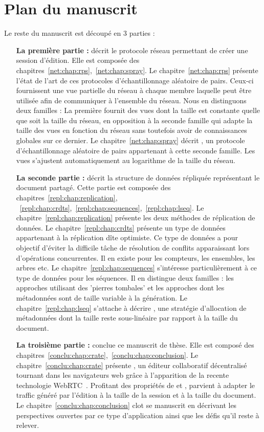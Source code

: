 
\section{Plan du manuscrit}

Le reste du manuscrit est découpé en 3 parties :

\begin{itemize}
\item [\textbf{La première partie :}] décrit le protocole réseau permettant de
  créer une session d'édition. Elle est composée des
  chapitres~\ref{net:chap:rps},~\ref{net:chap:spray}. Le
  chapitre~\ref{net:chap:rps} présente l'état de l'art de ces protocoles
  d'échantillonnage aléatoire de pairs. Ceux-ci fournissent une vue partielle du
  réseau à chaque membre laquelle peut être utilisée afin de communiquer à
  l'ensemble du réseau. Nous en distinguons deux familles : La première fournit
  des vues dont la taille est constante quelle que soit la taille du réseau, en
  opposition à la seconde famille qui adapte la taille des vues en fonction du
  réseau sans toutefois avoir de connaissances globales sur ce dernier. Le
  chapitre~\ref{net:chap:spray} décrit \SPRAY, un protocole d'échantillonnage
  aléatoire de pairs appartenant à cette seconde famille. Les vues s'ajustent
  automatiquement au logarithme de la taille du réseau.
\item [\textbf{La seconde partie :}] décrit la structure de données répliquée
  représentant le document partagé. Cette partie est composée des
  chapitres~\ref{repl:chap:replication},
  ~\ref{repl:chap:crdts},~\ref{repl:chap:sequences},~\ref{repl:chap:lseq}. Le
  chapitre~\ref{repl:chap:replication} présente les deux méthodes de réplication
  de données. Le chapitre~\ref{repl:chap:crdts} présente un type de données
  appartenant à la réplication dîte optimiste. Ce type de données a pour
  objectif d'éviter la difficile tâche de résolution de conflits apparaissant
  lors d'opérations concurrentes. Il en existe pour les compteurs, les
  ensembles, les arbres etc. Le chapitre~\ref{repl:chap:sequences} s'intéresse
  particulièrement à ce type de données pour les séquences. Il en distingue deux
  familles : les approches utilisant des 'pierres tombales' et les approches
  dont les métadonnées sont de taille variable à la génération. Le
  chapitre~\ref{repl:chap:lseq} s'attache à décrire \LSEQ, une stratégie
  d'allocation de métadonnées dont la taille reste sous-linéaire par rapport à
  la taille du document.
\item [\textbf{La troisième partie :}] conclue ce manuscrit de thèse. Elle est
  composé des
  chapitres~\ref{conclu:chap:crate},~\ref{conclu:chap:conclusion}. Le
  chapitre~\ref{conclu:chap:crate} présente \CRATE, un éditeur collaboratif
  décentralisé tournant dans les navigateurs web grâce à l'apparition de la
  recente technologie WebRTC~\cite{webrtc}. Profitant des propriétés de \SPRAY
  et \LSEQ, \CRATE parvient à adapter le traffic généré par l'édition à la
  taille de la session et à la taille du document. Le
  chapitre~\ref{conclu:chap:conclusion} clot se manuscrit en décrivant les
  perspectives ouvertes par ce type d'application ainsi que les défis qu'il
  reste à relever.
\end{itemize}

